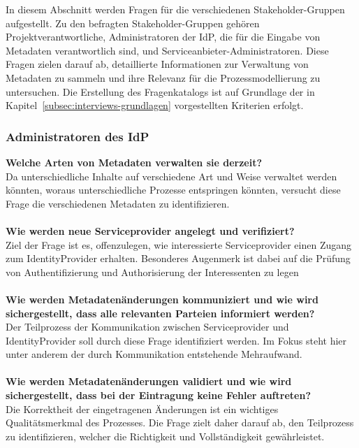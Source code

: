 In diesem Abschnitt werden Fragen für die verschiedenen Stakeholder-Gruppen aufgestellt.
Zu den befragten Stakeholder-Gruppen gehören Projektverantwortliche, Administratoren der IdP, die für die Eingabe von Metadaten verantwortlich sind, und Serviceanbieter-Administratoren.
Diese Fragen zielen darauf ab, detaillierte Informationen zur Verwaltung von Metadaten zu sammeln und ihre Relevanz für die Prozessmodellierung zu untersuchen.
Die Erstellung des Fragenkatalogs ist auf Grundlage der in Kapitel~\ref{subsec:interviews-grundlagen} vorgestellten Kriterien erfolgt.

\subsubsection{Administratoren des IdP}

\textbf{Welche Arten von Metadaten verwalten sie derzeit?}\\
Da unterschiedliche Inhalte auf verschiedene Art und Weise verwaltet werden könnten, woraus unterschiedliche Prozesse entspringen könnten, versucht diese Frage die verschiedenen Metadaten zu identifizieren.\\\\
\textbf{Wie werden neue Serviceprovider angelegt und verifiziert?}\\
Ziel der Frage ist es, offenzulegen, wie interessierte Serviceprovider einen Zugang zum IdentityProvider erhalten. Besonderes Augenmerk ist dabei auf die Prüfung von Authentifizierung und Authorisierung der Interessenten zu legen\\\\
\textbf{Wie werden Metadatenänderungen kommuniziert und wie wird sichergestellt, dass alle relevanten Parteien informiert werden?}\\
Der Teilprozess der Kommunikation zwischen Serviceprovider und IdentityProvider soll durch diese Frage identifiziert werden. Im Fokus steht hier unter anderem der durch Kommunikation entstehende Mehraufwand.\\\\
\textbf{Wie werden Metadatenänderungen validiert und wie wird sichergestellt, dass bei der Eintragung keine Fehler auftreten?}\\
Die Korrektheit der eingetragenen Änderungen ist ein wichtiges Qualitätsmerkmal des Prozesses. Die Frage zielt daher darauf ab, den Teilprozess zu identifizieren, welcher die Richtigkeit und Vollständigkeit gewährleistet.\\\\
